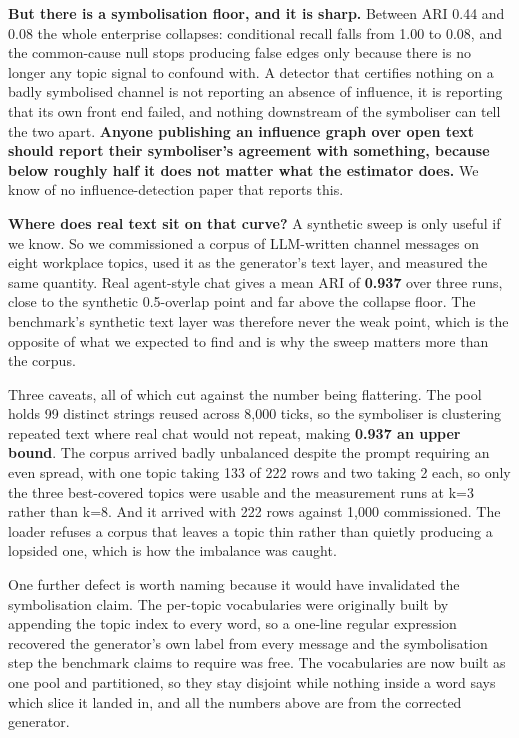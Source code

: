 \documentclass[11pt]{article}
\begin{document}
\textbf{But there is a symbolisation floor, and it is sharp.} Between ARI 0.44 and 0.08 the whole enterprise collapses: conditional recall falls from 1.00 to 0.08, and the common-cause null stops producing false edges only because there is no longer any topic signal to confound with. A detector that certifies nothing on a badly symbolised channel is not reporting an absence of influence, it is reporting that its own front end failed, and nothing downstream of the symboliser can tell the two apart. \textbf{Anyone publishing an influence graph over open text should report their symboliser's agreement with something, because below roughly half it does not matter what the estimator does.} We know of no influence-detection paper that reports this.

\textbf{Where does real text sit on that curve?} A synthetic sweep is only useful if we know. So we commissioned a corpus of LLM-written channel messages on eight workplace topics, used it as the generator's text layer, and measured the same quantity. Real agent-style chat gives a mean ARI of \textbf{0.937} over three runs, close to the synthetic 0.5-overlap point and far above the collapse floor. The benchmark's synthetic text layer was therefore never the weak point, which is the opposite of what we expected to find and is why the sweep matters more than the corpus.

Three caveats, all of which cut against the number being flattering. The pool holds 99 distinct strings reused across 8,000 ticks, so the symboliser is clustering repeated text where real chat would not repeat, making \textbf{0.937 an upper bound}. The corpus arrived badly unbalanced despite the prompt requiring an even spread, with one topic taking 133 of 222 rows and two taking 2 each, so only the three best-covered topics were usable and the measurement runs at k=3 rather than k=8. And it arrived with 222 rows against 1,000 commissioned. The loader refuses a corpus that leaves a topic thin rather than quietly producing a lopsided one, which is how the imbalance was caught.

One further defect is worth naming because it would have invalidated the symbolisation claim. The per-topic vocabularies were originally built by appending the topic index to every word, so a one-line regular expression recovered the generator's own label from every message and the symbolisation step the benchmark claims to require was free. The vocabularies are now built as one pool and partitioned, so they stay disjoint while nothing inside a word says which slice it landed in, and all the numbers above are from the corrected generator.
\end{document}
